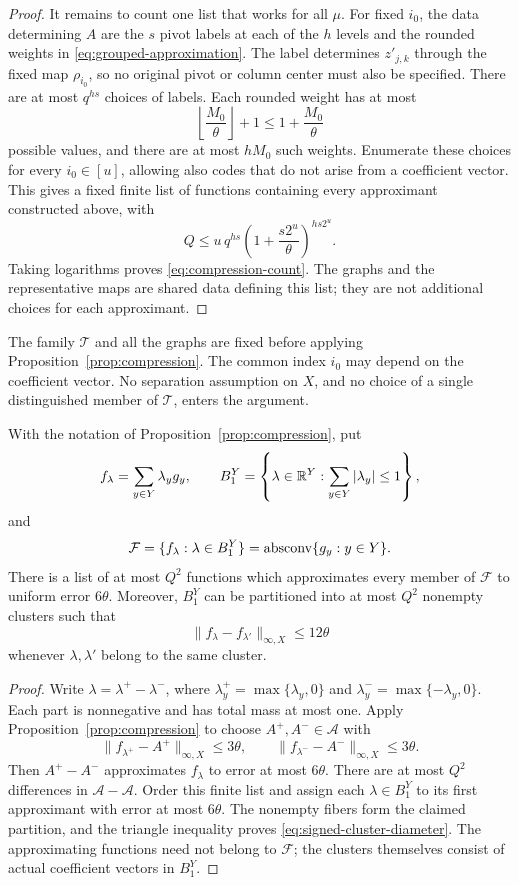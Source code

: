 \begin{proof}
It remains to count one list that works for all $\mu$.  For fixed $i_0$,
the data determining $A$ are the $s$ pivot labels at each of the $h$
levels and the rounded weights in \eqref{eq:grouped-approximation}.
The label determines $z'_{j,k}$ through the fixed map $\rho_{i_0}$, so
no original pivot or column center must also be specified.  There are
at most $q^{hs}$ choices of labels.  Each rounded weight has at most
\[
  \left\lfloor\frac{M_0}{\theta}\right\rfloor+1
  \le1+\frac{M_0}{\theta}
\]
possible values, and there are at most $hM_0$ such weights.
Enumerate these choices for every $i_0\in[u]$, allowing also codes that
do not arise from a coefficient vector.  This gives a fixed finite list
of functions containing every approximant constructed above, with
\[
  Q\le u\,q^{hs}
        \left(1+\frac{s2^u}{\theta}\right)^{hs2^u}.
\]
Taking logarithms proves \eqref{eq:compression-count}.  The graphs and
the representative maps are shared data defining this list; they are
not additional choices for each approximant.
\end{proof}

The family $\mathcal T$ and all the graphs are fixed before applying
Proposition~\ref{prop:compression}.  The common index $i_0$ may depend on
the coefficient vector.  No separation assumption on $X$, and no choice
of a single distinguished member of $\mathcal T$, enters the argument.

\begin{corollary}
\label{cor:signed-compression}
With the notation of Proposition~\ref{prop:compression}, put
\[
  f_\lambda=\sum_{y\in Y}\lambda_y g_y,
  \qquad
  B_1^Y=\left\{\lambda\in\mathbb R^Y:\sum_{y\in Y}|\lambda_y|\le1\right\},
\]
and
\[
  \mathcal F=\{f_\lambda:\lambda\in B_1^Y\}
            =\operatorname{absconv}\{g_y:y\in Y\}.
\]
There is a list of at most $Q^2$ functions which approximates every
member of $\mathcal F$ to uniform error $6\theta$.  Moreover, $B_1^Y$
can be partitioned into at most $Q^2$ nonempty clusters such that
\begin{equation}
  \|f_\lambda-f_{\lambda'}\|_{\infty,X}\le12\theta
  \label{eq:signed-cluster-diameter}
\end{equation}
whenever $\lambda,\lambda'$ belong to the same cluster.
\end{corollary}

\begin{proof}
Write $\lambda=\lambda^+-\lambda^-$, where
$\lambda_y^+=\max\{\lambda_y,0\}$ and
$\lambda_y^-=\max\{-\lambda_y,0\}$.  Each part is nonnegative and has
total mass at most one.  Apply Proposition~\ref{prop:compression} to
choose $A^+,A^-\in\mathcal A$ with
\[
  \|f_{\lambda^+}-A^+\|_{\infty,X}\le3\theta,
  \qquad
  \|f_{\lambda^-}-A^-\|_{\infty,X}\le3\theta.
\]
Then $A^+-A^-$ approximates $f_\lambda$ to error at most $6\theta$.
There are at most $Q^2$ differences in $\mathcal A-\mathcal A$.
Order this finite list and assign each $\lambda\in B_1^Y$ to its first
approximant with error at most $6\theta$.  The nonempty fibers form the
claimed partition, and the triangle inequality proves
\eqref{eq:signed-cluster-diameter}.  The approximating functions need
not belong to $\mathcal F$; the clusters themselves consist of actual
coefficient vectors in $B_1^Y$.
\end{proof}
